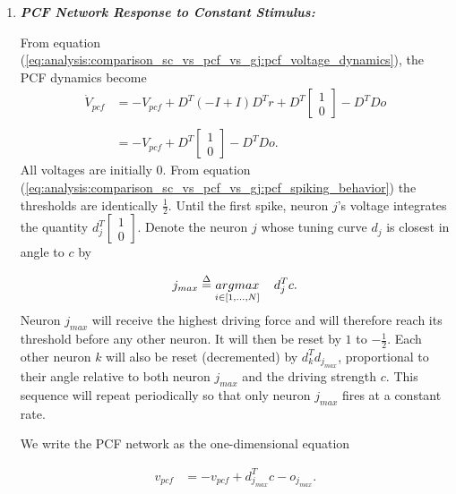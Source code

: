 \begin{enumerate}
 
\item \textbf{\textit{PCF Network Response to Constant Stimulus:}}

From equation (\ref{eq:analysis:comparison_sc_vs_pcf_vs_gj:pcf_voltage_dynamics}), the PCF dynamics become
\begin{align*}
	\dot{V}_{pcf}
	&=
	- V_{pcf}
	+
	D^T 
	\left(
		-I + I
	\right)
	D^T r
	+
	D^T 
	\begin{bmatrix}
		1 \\ 0
	\end{bmatrix}
	-
	D^T D o
	\\
	\\
	&= 
	-V_{pcf}
	+ 
	D^T 
	\begin{bmatrix}
		1 \\ 0
	\end{bmatrix}
	-
	D^T D o.
\end{align*}
All voltages are initially 0. From equation (\ref{eq:analysis:comparison_sc_vs_pcf_vs_gj:pcf_spiking_behavior}) the thresholds are identically $\frac{1}{2}$. Until the first spike, neuron $j$'s voltage integrates the quantity $d_j^T 	\begin{bmatrix}	1 \\ 0	\end{bmatrix}$. Denote the neuron $j$ whose tuning curve $d_j$ is closest in angle to $c$ by 

\begin{align*}
	j_{max} \overset{\Delta}{=}
	 \underset{
	 	i \in 
	 	\left[
	 		1, \ldots, N
	 	\right]
	 }
	 {argmax}
	 \hspace{4mm}
	 	d_j^T c.
\end{align*}
Neuron $j_{max}$ will receive the highest driving force and will therefore reach its threshold  before any other neuron. It will then be reset by $1$ to $- \frac{1}{2}$. Each other neuron $k$ will also be reset (decremented) by $d_k^T d_{j_{max}}$, proportional to their angle relative to both neuron $j_{max}$ and the driving strength $c$. This sequence will repeat periodically so that only neuron $j_{max}$ fires at a constant rate. 

We write the PCF network as the one-dimensional equation

\begin{align*}
	v_{pcf} &= 
	- v_{pcf}
	+ d_{j_{max}}^T c 
	- o_{j_{max}}.
\end{align*}


\end{enumerate}
